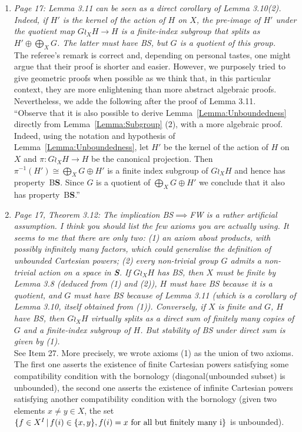 \documentclass[english,a4paper]{article}
\newcommand*{\BS}{B\textbf{S}}
\begin{document}
\begin{enumerate}
%
\item\textit{Page 17: Lemma 3.11 can be seen as a direct corollary of Lemma 3.10(2). Indeed, if $H'$ is the kernel of the action of $H$ on $X$, the pre-image of $H'$ under the quotient map $G\wr_XH\to H$ is a finite-index subgroup that splits as $H'\oplus\bigoplus_XG$. The latter must have BS, but $G$ is a quotient of this group.}\\
The referee's remark is correct and, depending on personal tastes, one might argue that their proof is shorter and easier.
However, we purposely tried to give geometric proofs when possible as we think that, in this particular context, they are more enlightening than more abstract algebraic proofs.
Nevertheless, we adde the following after the proof of Lemma 3.11.\\
``Observe that it is also possible to derive Lemma~\ref{Lemma:Unboundedness} directly from Lemma~\ref{Lemma:Subgroup} (2), with a more algebraic proof.
Indeed, using the notation and hypothesis of Lemma~\ref{Lemma:Unboundedness}, let $H'$ be the kernel of the action of $H$ on $X$ and $\pi\colon G\wr_XH\to H$ be the canonical projection. Then $\pi^{-1}(H')\cong \bigoplus_XG\oplus H'$ is a finite index subgroup of $G\wr_XH$ and hence has property~\BS.
Since $G$ is a quotient of $\bigoplus_XG\oplus H'$ we conclude that it also has property~\BS.''
%
\item\textit{Page 17, Theorem 3.12: The implication BS$\implies$FW is a rather artificial assumption. I think you should list the few axioms you are actually using. It seems to me that there are only two: (1) an axiom about products, with possibly infinitely many factors, which could generalise the definition of unbounded Cartesian powers; (2) every non-trivial group $G$ admits a non-trivial action on a space in \textbf{S}.
If $G\wr_XH$ has BS, then $X$ must be finite by Lemma 3.8 (deduced from (1) and (2)), $H$ must have BS because it is a quotient, and $G$ must have BS because of Lemma 3.11 (which is a corollary of Lemma 3.10, itself obtained from (1)). Conversely, if $X$ is finite and $G$, $H$ have BS, then $G\wr_XH$ virtually splits as a direct sum of finitely many copies of $G$ and a finite-index subgroup of $H$. But stability of BS under direct sum is given by (1).}\\
See Item 27. More precisely, we wrote axioms (1) as the union of two axioms. The first one asserts the existence of finite Cartesian powers satisfying some compatibility condition with the bornology (diagonal(unbounded subset) is unbounded), the second one asserts the existence of infinite Cartesian powers satisfying another compatibility condition with the bornology (given two elements $x\neq y\in X$, the set $\{f\in X^I\,|\,f(i)\in\{x,y\}, f(i)=x \textnormal{ for all but finitely many i}\}$ is unbounded).

\end{enumerate}
\end{document}
